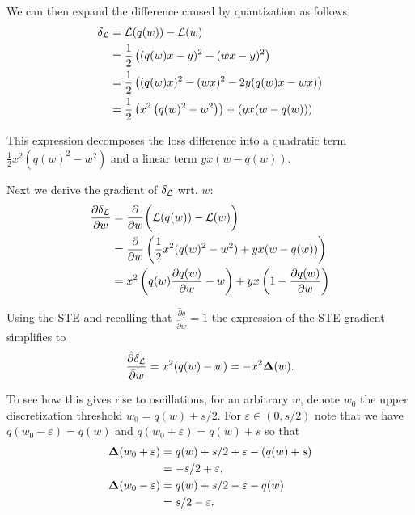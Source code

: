 We can then expand the difference caused by quantization as follows
\begin{align}
    \delta_{\text{$\mathcal{L}$}} &= \mathcal{L}(q(w))-\mathcal{L}(w)\\
    &= \frac{1}{2}\left( (q(w)x - y)^2 - (wx - y)^2 \right) \\
    &= \frac{1}{2}\left( (q(w)x)^2 - (wx)^2 - 2 y (q(w)x - wx) \right) \\
    &= \frac{1}{2}\left( x^2 \left( q(w)^2 - w^2 \right) \right) + \left( y x (w - q(w)) \right)
    \label{eq:quad_term}
\end{align}

This expression decomposes the loss difference into a quadratic term \( \frac{1}{2} x^2 (q(w)^2 - w^2) \) and a linear term \( y x (w - q(w)) \).

Next we derive the gradient of \( \delta_{\mathcal{L}} \) wrt. \( w \):
\begin{align}
\frac{\partial \delta_{\mathcal{L}}}{\partial w} &=\frac{\partial}{\partial w} \bigg( \mathcal{L}(q(w)) - \mathcal{L}(w) \bigg) \\
     &= \frac{\partial}{\partial w} \left( \frac{1}{2} x^2 (q(w)^2 - w^2) + y x (w - q(w)) \right) \\
    &= x^2 \left( q(w) \frac{\partial q(w)}{\partial w} - w \right) + y x \left( 1 - \frac{\partial q(w)}{\partial w} \right)
\end{align}

Using the STE and recalling that $\frac{\hat\partial q}{\hat\partial w} = 1$ the expression of the STE gradient simplifies to
\begin{align}
    \frac{\hat\partial \delta_{\mathcal{L}}}{\hat\partial w} = x^2 (q(w) - w)     = - x^2 \mathbf{\Delta}(w).
    \label{eq:qat_gradient_term}
\end{align}


To see how this gives rise to oscillations, for an arbitrary $w$, denote $w_0$ the upper discretization threshold $w_0 = q(w) + s/2$. For $\varepsilon \in (0, s/2)$ note that we have $q(w_0 - \varepsilon) = q(w)$ and $q(w_0 + \varepsilon) = q(w) + s$ so that
\begin{align}\label{eq:oscillations}
    \mathbf{\Delta}(w_0 + \varepsilon) &= q(w) + s/2 + \varepsilon - (q(w) + s) \\
    &= -s/2 + \varepsilon, \\
    \mathbf{\Delta}(w_0 - \varepsilon) &= q(w) + s/2 - \varepsilon - q(w)\\
    &= s/2 - \varepsilon.
\end{align}

